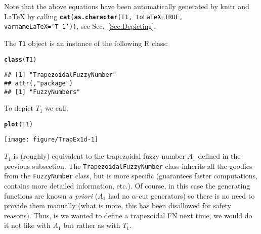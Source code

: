 \documentclass[11pt]{article}\usepackage[]{graphicx}\usepackage[]{color}
\makeatletter
\newcommand{\hlstr}[1]{\textcolor[rgb]{0.192,0.494,0.8}{#1}}%
\newcommand{\hlstd}[1]{\textcolor[rgb]{0.345,0.345,0.345}{#1}}%
\newcommand{\hlkwc}[1]{\textcolor[rgb]{0.333,0.667,0.333}{#1}}%
\newcommand{\hlkwd}[1]{\textcolor[rgb]{0.737,0.353,0.396}{\textbf{#1}}}%
\newenvironment{kframe}{%
 \def\at@end@of@kframe{}%
 \ifinner\ifhmode%
  \def\at@end@of@kframe{\end{minipage}}%
  \begin{minipage}{\columnwidth}%
 \fi\fi%
 \def\FrameCommand##1{\hskip\@totalleftmargin \hskip-\fboxsep
 \colorbox{shadecolor}{##1}\hskip-\fboxsep
     \hskip-\linewidth \hskip-\@totalleftmargin \hskip\columnwidth}%
 \MakeFramed {\advance\hsize-\width
   \@totalleftmargin\z@ \linewidth\hsize
   \@setminipage}}%
 {\par\unskip\endMakeFramed%
 \at@end@of@kframe}
\newenvironment{knitrout}{}{} %
\newcommand{\package}[1]{\textsf{#1}\xspace}
\newcommand{\lang}[1]{\textsf{#1}\xspace}
\newcommand{\R}{\lang{R}}
\newcommand{\func}[1]{\texttt{\hlkwd{#1}}}
\newcommand{\argument}[1]{\texttt{\hlkwc{#1}}}
\newcommand{\str}[1]{\texttt{\hlstr{#1}}}
\makeatother
\begin{document}
\noindent
Note that the above equations have been automatically generated by \package{knitr}
and \LaTeX{} by
calling \texttt{\func{cat}(\func{as.character}(T1, \argument{toLaTeX=}TRUE, \argument{varnameLaTeX=}\str{'{}T\_1'{}}))},
see Sec.~\ref{Sec:Depicting}.

\noindent
The \texttt{T1} object is an instance of the following \R class:

\begin{knitrout}\small
{}\color{fgcolor}\begin{kframe}
\begin{alltt}
\hlkwd{class}\hlstd{(T1)}
\end{alltt}
\begin{verbatim}
## [1] "TrapezoidalFuzzyNumber"
## attr(,"package")
## [1] "FuzzyNumbers"
\end{verbatim}
\end{kframe}
\end{knitrout}

\noindent
To depict $T_1$ we call:

\begin{knitrout}\small
{}\color{fgcolor}\begin{kframe}
\begin{alltt}
\hlkwd{plot}\hlstd{(T1)}
\end{alltt}
\end{kframe}
\end{knitrout}

\begin{center}
\begin{knitrout}\small
{}\color{fgcolor}

{\centering \texttt{[image: figure/TrapEx1d-1]} 

}



\end{knitrout}
\end{center}





\bigskip
$T_1$ is (roughly) equivalent to the trapezoidal fuzzy number $A_1$
defined in the previous subsection.
The \texttt{Trapezo\-idalFuzzyNumber}
class inherits all the goodies from the \texttt{FuzzyNumber} class,
but is more specific (guarantees faster computations,
contains more detailed information, etc.).
Of course, in this case the generating functions are known \textit{a priori}
($A_1$ had no $\alpha$-cut generators)
so there is no need to provide them manually
(what is more, this has been disallowed for safety reasons).
Thus, is we wanted to define a trapezoidal FN next time, we would
do it not like with $A_1$ but rather as with $T_1$.
\end{document}
